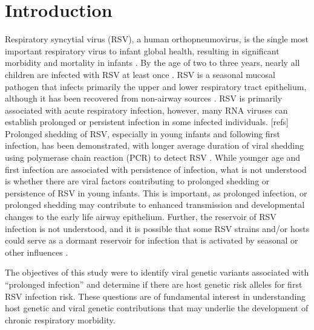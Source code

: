 \documentclass{article} %
\begin{document}
\section{Introduction}
Respiratory syncytial virus (RSV), a human orthopneumovirus, is the single most important respiratory virus to infant global health, resulting in significant morbidity and mortality in infants 
\cite{hall_burden_2009}.
By the age of two to three years, nearly all children are infected with RSV at least once 
\cite{glezen_risk_1986}.
RSV is a seasonal mucosal pathogen that infects primarily the upper and lower respiratory tract epithelium, although it has been recovered from non-airway sources 
\cite{bokun_respiratory_2019,
cubie_detection_1997,
nadal_isolation_1990,
odonnell_respiratory_1998,
rezaee_respiratory_2011,
rohwedder_detection_1998}.
RSV is primarily associated with acute respiratory infection, however, many RNA viruses can establish prolonged or persistent infection in some infected individuals. [refs] 
Prolonged shedding of RSV, especially in young infants and following first infection, has been demonstrated, with longer average duration of viral shedding using polymerase chain reaction (PCR) to detect RSV 
\cite{munywoki_influence_2015}.
While younger age and first infection are associated with persistence of infection, what is not understood is whether there are viral factors contributing to prolonged shedding or persistence of RSV in young infants. 
This is important, as prolonged infection, or prolonged shedding may contribute to enhanced transmission and developmental changes to the early life airway epithelium. 
Further, the reservoir of RSV infection is not understood, 
and it is possible that some RSV strains and/or hosts could serve as a dormant reservoir for infection that is activated by seasonal or other influences 
\citep{hobson_persistent_2008}.

The objectives of this study were to identify viral genetic variants associated with ``prolonged infection'' and determine if there are host genetic risk alleles for first RSV infection risk. 
These questions are of fundamental interest in understanding host genetic and viral genetic contributions that may underlie the development of chronic respiratory morbidity.
\end{document}
